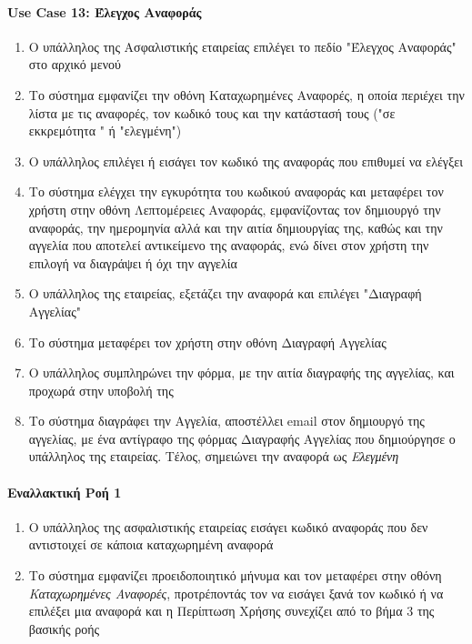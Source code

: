 \documentclass{../ol-softwaremanual}
\begin{document}
	\paragraph{\en Use Case 13: \gr Έλεγχος Αναφοράς}  
	\begin{enumerate}
		\item Ο υπάλληλος της Ασφαλιστικής εταιρείας επιλέγει το πεδίο \en"\gr Έλεγχος Αναφοράς\en" \gr στο αρχικό μενού
		\item Το σύστημα εμφανίζει την οθόνη Καταχωρημένες Αναφορές, η οποία περιέχει την λίστα με τις αναφορές, τον κωδικό τους και την κατάστασή τους (\en"\gr σε εκκρεμότητα \en" \gr ή \en"\gr ελεγμένη\en"\gr)
		\item Ο υπάλληλος επιλέγει ή εισάγει τον κωδικό της αναφοράς που επιθυμεί να ελέγξει 
		\item Το σύστημα ελέγχει την εγκυρότητα του κωδικού αναφοράς και μεταφέρει τον χρήστη στην οθόνη Λεπτομέρειες Αναφοράς, εμφανίζοντας τον δημιουργό την αναφοράς, την ημερομηνία αλλά και την αιτία δημιουργίας της, καθώς και την αγγελία που αποτελεί αντικείμενο της αναφοράς, ενώ δίνει στον χρήστη την επιλογή να διαγράψει ή όχι την αγγελία
		\item Ο υπάλληλος της εταιρείας, εξετάζει την αναφορά και επιλέγει \en"\gr Διαγραφή Αγγελίας\en"\gr 
		\item Το σύστημα μεταφέρει τον χρήστη στην οθόνη Διαγραφή Αγγελίας
		\item Ο υπάλληλος συμπληρώνει την φόρμα, με την αιτία διαγραφής της αγγελίας, και προχωρά στην υποβολή της
		\item Το σύστημα διαγράφει την Αγγελία, αποστέλλει \en email \gr στον δημιουργό της αγγελίας, με ένα αντίγραφο της φόρμας Διαγραφής Αγγελίας που δημιούργησε ο υπάλληλος της εταιρείας. Τέλος, σημειώνει την αναφορά ως \textit{Ελεγμένη}
	\end{enumerate}
	
	\paragraph{Εναλλακτική Ροή 1}
	\begin{enumerate}
		\item Ο υπάλληλος της ασφαλιστικής εταιρείας εισάγει κωδικό αναφοράς που δεν αντιστοιχεί σε κάποια καταχωρημένη αναφορά
		\item Το σύστημα εμφανίζει προειδοποιητικό μήνυμα και τον μεταφέρει στην οθόνη \textit{Καταχωρημένες Αναφορές}, προτρέποντάς τον να εισάγει ξανά τον κωδικό ή να επιλέξει μια αναφορά και η Περίπτωση Χρήσης συνεχίζει από το βήμα 3 της βασικής ροής
	\end{enumerate}	
	
\end{document}
